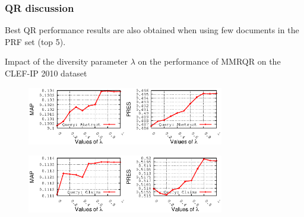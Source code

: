 \documentclass[xcolor=x11names,compress]{beamer}
\renewcommand{\(}{\begin{columns}}
\renewcommand{\)}{\end{columns}}
\newcommand{\<}[1]{\begin{column}{#1}}
\renewcommand{\>}{\end{column}}
\begin{document}
\begin{frame}
\frametitle{QR discussion}

Best QR performance results are also obtained when using few
documents in the PRF set (top 5).

Impact of the diversity parameter $\lambda$ on the performance of
MMRQR on the CLEF-IP 2010 dataset


\begin{figure}
\begin{centering}
\includegraphics[width=4.3cm]{../mmrqrResults-lambda/qAbstract-sDescription_MAP_2010}\includegraphics[width=4.3cm]{../mmrqrResults-lambda/qAbstract-sDescription_PRES_2010}
\par\end{centering}

\begin{centering}
\includegraphics[width=4.3cm]{../mmrqrResults-lambda/qClaims-sDescription_MAP_2010}\includegraphics[width=4.3cm]{../mmrqrResults-lambda/qClaims-sDescription_PRES_2010}
\par\end{centering}
\end{figure}

\end{frame}
\end{document}
